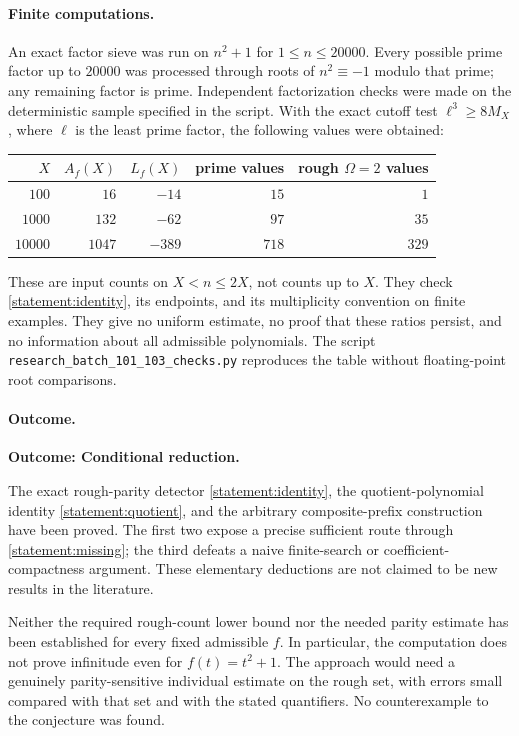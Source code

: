 \documentclass[11pt]{article}
\begin{document}
\paragraph{Finite computations.}
An exact factor sieve was run on $n^2+1$ for $1\le n\le20000$. Every possible
prime factor up to $20000$ was processed through roots of $n^2\equiv-1$
modulo that prime; any remaining factor is prime. Independent factorization
checks were made on the deterministic sample specified in the script.
With the exact cutoff test $\ell^3\ge8M_X$, where $\ell$ is the least prime
factor, the following values were obtained:
\begin{center}
\begin{tabular}{r|r r|r r}
$X$ & $A_f(X)$ & $L_f(X)$ & prime values & rough $\Omega=2$ values\\
\hline
$100$   & $16$   & $-14$  & $15$  & $1$\\
$1000$  & $132$  & $-62$  & $97$  & $35$\\
$10000$ & $1047$ & $-389$ & $718$ & $329$
\end{tabular}
\end{center}
These are input counts on $X<n\le2X$, not counts up to $X$.
They check \eqref{statement:identity}, its endpoints, and its multiplicity
convention on finite examples. They give no uniform estimate, no proof that
these ratios persist, and no information about all admissible polynomials.
The script \texttt{research\_batch\_101\_103\_checks.py} reproduces the table
without floating-point root comparisons.

\paragraph{Outcome.}
\textbf{Outcome: Conditional reduction.}

The exact rough-parity detector \eqref{statement:identity}, the quotient-polynomial
identity \eqref{statement:quotient}, and the arbitrary composite-prefix construction
have been proved. The first two expose a precise sufficient route through
\eqref{statement:missing}; the third defeats a naive finite-search or
coefficient-compactness argument. These elementary deductions are not claimed
to be new results in the literature.

Neither the required rough-count lower bound nor the needed parity estimate
has been established for every fixed admissible $f$. In particular, the
computation does not prove infinitude even for $f(t)=t^2+1$. The approach
would need a genuinely parity-sensitive individual estimate on the rough
set, with errors small compared with that set and with the stated quantifiers.
No counterexample to the conjecture was found.
\end{document}
